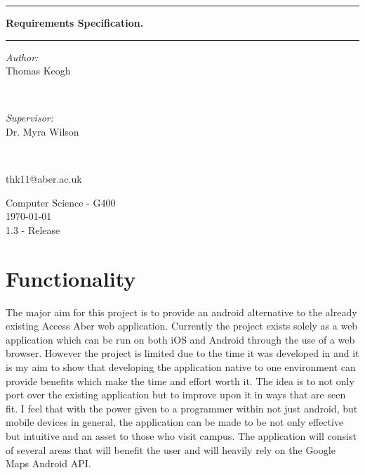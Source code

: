 \documentclass[10pt,a4paper]{article}
\begin{document}
\begin{titlepage}
\center
\hrule
\vspace{0.3cm}

\huge
\textbf{  Requirements Specification.}
\vspace{0.3cm}
\hrule
\vspace{0.6cm}
\large

\begin{minipage}{0.4\textwidth}
\begin{flushleft} \large
\emph{Author:}\\
Thomas Keogh %
\end{flushleft}
\end{minipage}
~
\begin{minipage}{0.4\textwidth}
\begin{flushright} \large
\emph{Supervisor:} \\
Dr. Myra Wilson %
\end{flushright}
\end{minipage}\\

 \vspace{1cm}

 thk11@aber.ac.uk




\vspace{1cm}


\vspace{0.1cm}

Computer Science - G400
\\
\vspace{0.1cm}
\today \\
\vspace{0.1cm}
1.3 - Release


\end{titlepage}

\section{Functionality}

The major aim for this project is to provide an android alternative to the already existing Access Aber web application. Currently the project exists solely as a web application which can be run on both iOS and Android through the use of a web browser. However the project is limited due to the time it was developed in and it is my aim to show that developing the application native to one environment can provide benefits which make the time and effort worth it. The idea is to not only port over the existing application but to improve upon it in ways that are seen fit. I feel that with the power given to a programmer within not just android, but mobile devices in general, the application can be made to be not only effective but intuitive and an asset to those who visit campus. The application will consist of several areas that will benefit the user and will heavily rely on the Google Maps Android API. 
\end{document}
